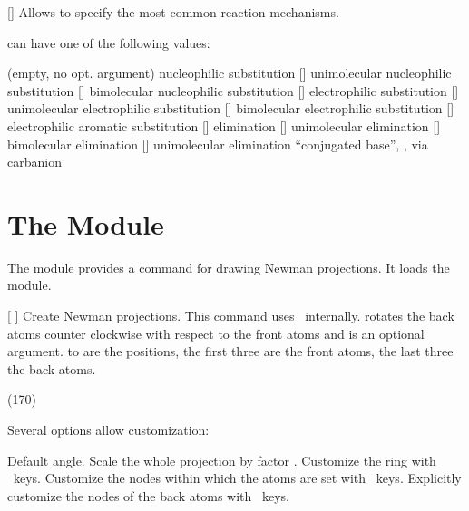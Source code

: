 \documentclass{chemmacros-manual}
\begin{document}
\begin{commands}
  []
    Allows to specify the most common reaction mechanisms.
\end{commands}
 can have one of the following values:
\begin{commands}
    (empty, no opt. argument) nucleophilic substitution \mech
  []
    unimolecular nucleophilic substitution \mech[1]
  []
    bimolecular nucleophilic substitution \mech[2]
  []
    electrophilic substitution \mech[se]
  []
    unimolecular electrophilic substitution \mech[1e]
  []
    bimolecular electrophilic substitution \mech[2e]
  []
    electrophilic aromatic substitution \mech[ar]
  []
    elimination \mech[e]
  []
    unimolecular elimination \mech[e1]
  []
    bimolecular elimination \mech[e2]
  []
    unimolecular elimination \enquote{conjugated base}, \ie, via carbanion
    \mech[cb]
\end{commands}

\section{The  Module}\label{sec:newman-module}
The  module provides a command for drawing Newman
projections.  It loads the  module.
\begin{commands}
  [%
    ]
    Create Newman projections.  This command uses \TikZ\ internally.
     rotates the back atoms counter clockwise with respect to the
    front atoms and is an optional argument.   to  are the
    positions, the first three are the front atoms, the last three the back
    atoms.
\end{commands}

\begin{example}
  \newman{} \newman(170){}
    
\end{example}

Several options allow customization:
\begin{options}
    Default angle.
    Scale the whole projection by factor .
  \Default
    Customize the ring with \TikZ\ keys.
  \Default
    Customize the nodes within which the atoms are set with \TikZ\ keys.
  \Default
    Explicitly customize the nodes of the back atoms with \TikZ\ keys.
\end{options}
\end{document}
